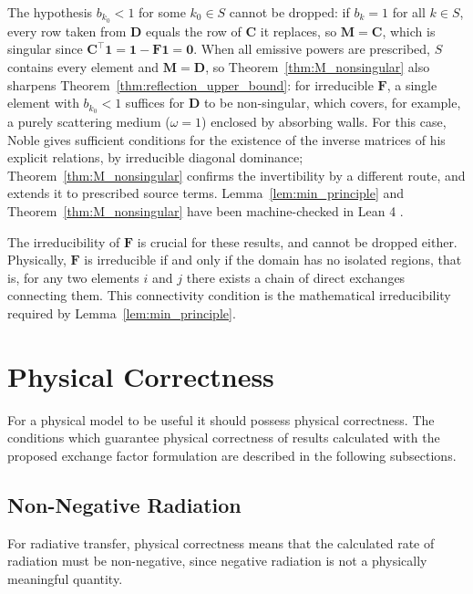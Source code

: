 \documentclass[preprint,1p,times]{elsarticle}
\theoremstyle{plain}
\theoremstyle{definition}
\theoremstyle{remark}
\begin{document}
The hypothesis $b_{k_0} < 1$ for some $k_0 \in S$ cannot be dropped: if $b_k = 1$ for all $k \in S$, every row taken from $\mathbf{D}$ equals the row of $\mathbf{C}$ it replaces, so $\mathbf{M} = \mathbf{C}$, which is singular since $\mathbf{C}^\top\mathbf{1} = \mathbf{1} - \mathbf{F}\mathbf{1} = \mathbf{0}$. When all emissive powers are prescribed, $S$ contains every element and $\mathbf{M} = \mathbf{D}$, so Theorem~\ref{thm:M_nonsingular} also sharpens Theorem~\ref{thm:reflection_upper_bound}: for irreducible $\mathbf{F}$, a single element with $b_{k_0} < 1$ suffices for $\mathbf{D}$ to be non-singular, which covers, for example, a purely scattering medium ($\omega = 1$) enclosed by absorbing walls. For this case, Noble \citep{Noble1975} gives sufficient conditions for the existence of the inverse matrices of his explicit relations, by irreducible diagonal dominance; Theorem~\ref{thm:M_nonsingular} confirms the invertibility by a different route, and extends it to prescribed source terms. Lemma~\ref{lem:min_principle} and Theorem~\ref{thm:M_nonsingular} have been machine-checked in Lean 4 \citep{Bielefeld2024}.

The irreducibility of $\mathbf{F}$ is crucial for these results, and cannot be dropped either. Physically, $\mathbf{F}$ is irreducible if and only if the domain has no isolated regions, that is, for any two elements $i$ and $j$ there exists a chain of direct exchanges connecting them. This connectivity condition is the mathematical irreducibility required by Lemma~\ref{lem:min_principle}.

\section{Physical Correctness}
\label{sec:physical_correct}

For a physical model to be useful it should possess physical correctness. The conditions which guarantee physical correctness of results calculated with the proposed exchange factor formulation are described in the following subsections.

\subsection{Non-Negative Radiation}

For radiative transfer, physical correctness means that the calculated rate of radiation must be non-negative, since negative radiation is not a physically meaningful quantity.
\end{document}
